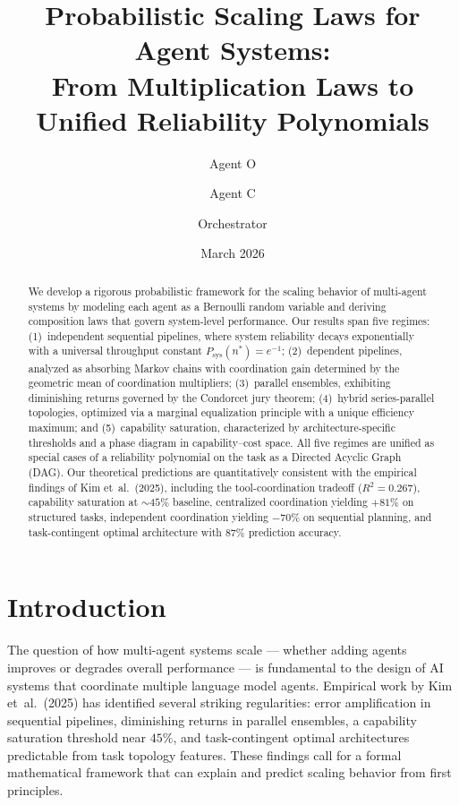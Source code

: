 \documentclass[12pt,a4paper]{article}
\title{%
  Probabilistic Scaling Laws for Agent Systems:\\[4pt]
  \large From Multiplication Laws to Unified Reliability Polynomials%
}
\author{%
  Agent O \and Agent C \and Orchestrator%
}
\date{March 2026}
\theoremstyle{plain}
\theoremstyle{definition}
\theoremstyle{remark}
\newcommand{\Psys}{P_{\mathrm{sys}}}
\begin{document}
\maketitle

\begin{abstract}
We develop a rigorous probabilistic framework for the scaling behavior of
multi-agent systems by modeling each agent as a Bernoulli random variable and
deriving composition laws that govern system-level performance.  Our results
span five regimes: (1)~independent sequential pipelines, where system
reliability decays exponentially with a universal throughput constant
$\Psys(n^*) = e^{-1}$; (2)~dependent pipelines, analyzed as absorbing Markov
chains with coordination gain determined by the geometric mean of coordination
multipliers; (3)~parallel ensembles, exhibiting diminishing returns governed by
the Condorcet jury theorem; (4)~hybrid series-parallel topologies, optimized
via a marginal equalization principle with a unique efficiency maximum; and
(5)~capability saturation, characterized by architecture-specific thresholds
and a phase diagram in capability--cost space.  All five regimes are unified as
special cases of a reliability polynomial on the task as a Directed Acyclic Graph (DAG).  Our theoretical
predictions are quantitatively consistent with the empirical findings of Kim
et~al.\ (2025), including the tool-coordination tradeoff ($R^2 = 0.267$),
capability saturation at $\sim\!45\%$ baseline, centralized coordination
yielding $+81\%$ on structured tasks, independent coordination yielding
$-70\%$ on sequential planning, and task-contingent optimal architecture with
$87\%$ prediction accuracy.
\end{abstract}

\tableofcontents
\newpage

\section{Introduction}
\label{sec:introduction}

The question of how multi-agent systems scale --- whether adding agents improves
or degrades overall performance --- is fundamental to the design of AI systems
that coordinate multiple language model agents.  Empirical work by Kim
et~al.~(2025) has identified several striking regularities: error amplification
in sequential pipelines, diminishing returns in parallel ensembles, a
capability saturation threshold near $45\%$, and task-contingent optimal
architectures predictable from task topology features.  These findings call
for a formal mathematical framework that can explain and predict scaling
behavior from first principles.
\end{document}

